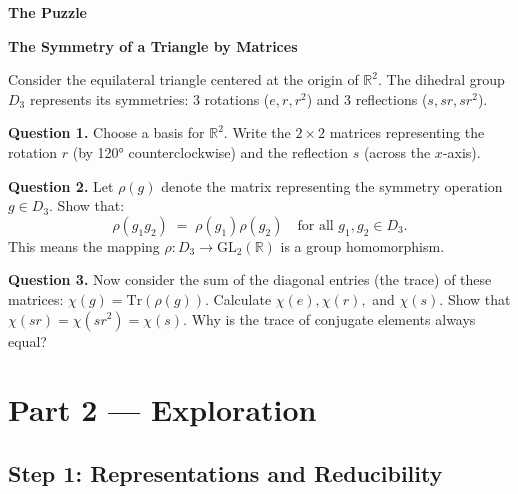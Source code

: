 \documentclass[12pt, a4paper]{article}
\newenvironment{puzzlebox}
  {\par\medskip\fillcolorbox{LightGold}{PuzzleColor}{The Puzzle}}
  {\par\medskip}
\newcommand{\fillcolorbox}[3]{%
  \noindent
  \filldrawbox{#1}{#2}{\textbf{\sffamily\color{white}#3}}\par\nobreak\vspace{4pt}
}
\newcommand{\filldrawbox}[3]{%
  \colorbox{#1}{\parbox{\dimexpr\linewidth-2\fboxsep\relax}{%
    \vspace{4pt}\noindent\hspace{4pt}#3\vspace{4pt}%
  }}%
}
\begin{document}
\begin{puzzlebox}
\textbf{The Symmetry of a Triangle by Matrices}

Consider the equilateral triangle centered at the origin of $\mathbb{R}^2$. The dihedral group $D_3$ represents its symmetries: 3 rotations ($e, r, r^2$) and 3 reflections ($s, sr, sr^2$).

\medskip
\textbf{Question 1.} Choose a basis for $\mathbb{R}^2$. Write the $2\times 2$ matrices representing the rotation $r$ (by \ang{120} counterclockwise) and the reflection $s$ (across the $x$-axis).

\textbf{Question 2.} Let $\rho(g)$ denote the matrix representing the symmetry operation $g \in D_3$. Show that:
\[
  \rho(g_1 g_2) \;=\; \rho(g_1)\rho(g_2) \quad \text{for all } g_1, g_2 \in D_3.
\]
This means the mapping $\rho: D_3 \to \text{GL}_2(\mathbb{R})$ is a group homomorphism.

\textbf{Question 3.} Now consider the sum of the diagonal entries (the trace) of these matrices: $\chi(g) = \text{Tr}(\rho(g))$. Calculate $\chi(e), \chi(r),$ and $\chi(s)$. Show that $\chi(s r) = \chi(sr^2) = \chi(s)$. Why is the trace of conjugate elements always equal?
\end{puzzlebox}

\newpage

\section{Part 2 --- Exploration}

\subsection{Step 1: Representations and Reducibility}
\end{document}
